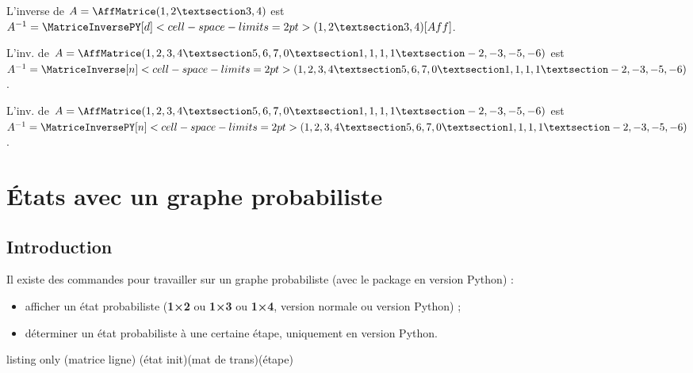 \documentclass[french,a4paper,11pt]{article}
\newcommand\cmaj[1]{\tcbox[vignetteMaJ]{#1}\xspace}
\begin{document}
\begin{PresentationCode}{}
L'inverse de $A=\AffMatrice(1,2 § 3,4)$ est
$A^{-1}=\MatriceInversePY[d]<cell-space-limits=2pt>(1,2 § 3,4)[Aff]$.
\end{PresentationCode}

\begin{PresentationCode}{}
L'inv. de $A=\AffMatrice(1,2,3,4 § 5,6,7,0 § 1,1,1,1 § -2,-3,-5,-6)$ est
$A^{-1}=
\MatriceInverse[n]<cell-space-limits=2pt>(1,2,3,4 § 5,6,7,0 § 1,1,1,1 § -2,-3,-5,-6)$.
\end{PresentationCode}

\begin{PresentationCode}{}
L'inv. de $A=\AffMatrice(1,2,3,4 § 5,6,7,0 § 1,1,1,1 § -2,-3,-5,-6)$ est
$A^{-1}=
\MatriceInversePY[n]<cell-space-limits=2pt>(1,2,3,4 § 5,6,7,0 § 1,1,1,1 § -2,-3,-5,-6)$.
\end{PresentationCode}

\pagebreak

\section{États avec un graphe probabiliste}

\subsection{Introduction}

\begin{cautionblock}
\cmaj{0.1.4} Il existe des commandes pour travailler sur un graphe probabiliste (avec le package en version \textsf{Python}) :

\begin{itemize}
	\item afficher un état probabiliste (\textbf{1×2} ou \textbf{1×3} ou \textbf{1×4}, version normale ou version \textsf{Python}) ;
	\item déterminer un état probabiliste à une certaine étape, uniquement en version \textsf{Python}.
\end{itemize}
\vspace*{-\baselineskip}\leavevmode
\end{cautionblock}

\begin{PresentationCode}{listing only}
(matrice ligne)
(état init)(mat de trans)(étape)
\end{PresentationCode}
\end{document}
